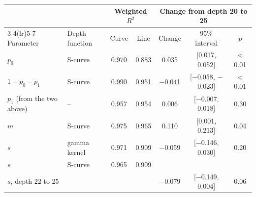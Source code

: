 \begin{tabular}{llccccc}
\toprule
 & & \multicolumn{2}{c}{Weighted $R^2$} & \multicolumn{3}{c}{Change from depth 20 to 25} \\
\cmidrule(lr){3-4}\cmidrule(lr){5-7}
Parameter & Depth function & Curve & Line & Change & 95\% interval & $p$ \\
\midrule
$p_0$ & S-curve & 0.970 & 0.883 & 0.035 & [0.017, 0.052] & $<$0.01 \\
$1-p_0-p_1$ & S-curve & 0.990 & 0.951 & $-$0.041 & [$-$0.058, $-$0.023] & $<$0.01 \\
$p_1$ (from the two above) & -- & 0.957 & 0.954 & 0.006 & [$-$0.007, 0.018] & 0.30 \\
$m$ & S-curve & 0.975 & 0.965 & 0.110 & [0.001, 0.213] & 0.04 \\
$s$ & gamma kernel & 0.971 & 0.909 & $-$0.059 & [$-$0.146, 0.030] & 0.20 \\
$s$ & S-curve & 0.965 & 0.909 &  & &  \\
\midrule
$s$, depth 22 to 25 & & & & $-$0.079 & [$-$0.149, 0.004] & 0.06 \\
\bottomrule
\end{tabular}
